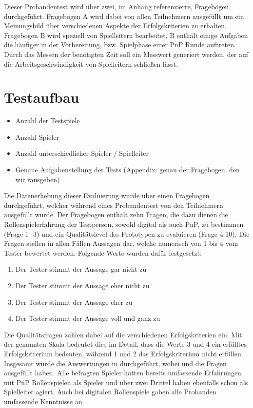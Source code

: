 Dieser Probandentest wird über zwei, im \hyperref[sec:frageboegen]{Anhang referenzierte}, Fragebögen durchgeführt. Fragebogen A wird dabei von allen Teilnehmern ausgefüllt um ein Meinungsbild über verschiedenen Aspekte der Erfolgskriterien zu erhalten. Fragebogen B wird speziell von Spielleitern bearbeitet. B enthält einige Aufgaben die häufiger in der Vorbereitung, bzw. Spielphase einer PnP Runde auftreten. Durch das Messen der benötigten Zeit soll ein Messwert generiert werden, der auf die Arbeitsgeschwindigkeit von Spielleitern schließen lässt.
  



\section{Testaufbau}
\label{sec:Testaufbau}
\begin{itemize}
	\item Anzahl der Testspiele
	\item Anzahl Spieler
	\item Anzahl unterschiedlicher Spieler / Spielleiter
	\item Genaue Aufgabenstellung der Tests (Appendix: genau der Fragebogen, den wir rausgeben)
\end{itemize}
Die Datenerhebung dieser Evaluierung wurde über einen Fragebogen durchgeführt, welcher während eines Probandentest von den Teilnehmern ausgefüllt wurde. Der Fragebogen enthält zehn Fragen, die dazu dienen die Rollenspielerfahrung der Testperson, sowohl digital als auch PnP, zu bestimmen (Frage 1 -3) und ein Qualitätslevel des Prototypen zu evaluieren (Frage 4-10). Die Fragen stellen in allen Fällen Aussagen dar, welche numerisch von 1 bis 4 vom Tester bewertet werden. Folgende Werte wurden dafür festgesetzt:

\begin{enumerate}
	\item Der Tester stimmt der Aussage gar nicht zu
	\item Der Tester stimmt der Aussage eher nicht zu
	\item Der Tester stimmt der Aussage eher zu
	\item Der Tester stimmt der Aussage voll und ganz zu
\end{enumerate}

Die Qualitätsfragen zahlen dabei auf die verschiedenen Erfolgskriterien ein. Mit der genannten Skala bedeutet dies im Detail, dass die Werte 3 und 4 ein erfülltes Erfolgskriterium bedeuten, während 1 und 2 das Erfolgskriterium nicht erfüllen. \newline
Insgesamt wurde die Auswertungen in  durchgeführt, wobei  und  die Fragen ausgefüllt haben. Alle befragten Spieler hatten bereits umfassende Erfahrungen mit PnP Rollenspielen als Spieler und über zwei Drittel haben ebenfalls schon als Spielleiter agiert. Auch bei digitalen Rollenspiele gaben alle Probanden umfassende Kenntnisse an. 



